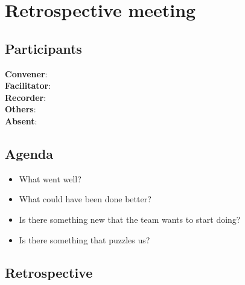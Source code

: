 \section*{Retrospective meeting}
\subsection*{Participants}

\textbf{Convener}:\scrummaster{} \\
\textbf{Facilitator}: \facilitator{}  \\
\textbf{Recorder}: \scrummaster{} \\
\textbf{Others}: \groupleader{} \\
\textbf{Absent}: 

\subsection*{Agenda}
\begin{itemize}
    \item What went well?
    \item What could have been done better?
    \item Is there something new that the team wants to start doing?
    \item Is there something that puzzles us?
\end{itemize}

\subsection*{Retrospective}

\noindent

\par

